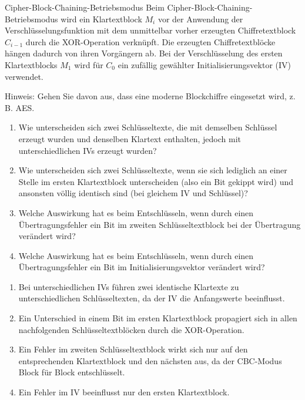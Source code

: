 \documentclass{article}
\begin{document}
\begin{exercise}{Cipher-Block-Chaining-Betriebsmodus}
  Beim Cipher-Block-Chaining-Betriebsmodus wird ein Klartextblock $ M_i $ vor der Anwendung der Verschlüsselungsfunktion mit dem unmittelbar vorher erzeugten Chiffretextblock $ C_{i-1} $ durch die XOR-Operation verknüpft.
  Die erzeugten Chiffretextblöcke hängen dadurch von ihren Vorgängern ab. Bei der Verschlüsselung des ersten Klartextblocks $ M_1 $ wird für $ C_0 $ ein zufällig gewählter Initialisierungsvektor (IV) verwendet.
  
  Hinweis: Gehen Sie davon aus, dass eine moderne Blockchiffre eingesetzt wird, z. B. AES.
  \begin{enumerate}
    \item Wie unterscheiden sich zwei Schlüsseltexte, die mit demselben Schlüssel erzeugt wurden und denselben Klartext enthalten, jedoch mit unterschiedlichen IVs erzeugt wurden?
    \item Wie unterscheiden sich zwei Schlüsseltexte, wenn sie sich lediglich an einer Stelle im ersten Klartextblock unterscheiden (also ein Bit gekippt wird) und ansonsten völlig identisch sind (bei gleichem IV und Schlüssel)?
    \item Welche Auswirkung hat es beim Entschlüsseln, wenn durch einen Übertragungsfehler ein Bit im zweiten Schlüsseltextblock bei der Übertragung verändert wird?
    \item Welche Auswirkung hat es beim Entschlüsseln, wenn durch einen Übertragungsfehler ein Bit im Initialisierungsvektor verändert wird?
  \end{enumerate}

  \begin{solution}
    \begin{enumerate}
        \item Bei unterschiedlichen IVs führen zwei identische Klartexte zu unterschiedlichen Schlüsseltexten, da der IV die Anfangswerte beeinflusst.
        \item Ein Unterschied in einem Bit im ersten Klartextblock propagiert sich in allen nachfolgenden Schlüsseltextblöcken durch die XOR-Operation.
        \item Ein Fehler im zweiten Schlüsseltextblock wirkt sich nur auf den entsprechenden Klartextblock und den nächsten aus, da der CBC-Modus Block für Block entschlüsselt.
        \item Ein Fehler im IV beeinflusst nur den ersten Klartextblock.
    \end{enumerate}
  \end{solution}
\end{exercise}
\end{document}
